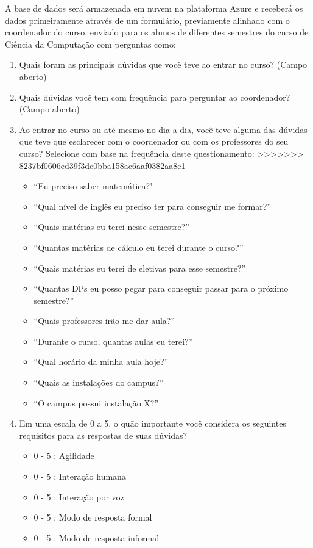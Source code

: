 \documentclass[
	12pt,				%
	oneside,
	a4paper,			%
	english,			%
	french,				%
	spanish,			%
	brazil				%
	]{abntex2}
\begin{document}
\begin{enumerate}
A base de dados será armazenada em nuvem na plataforma Azure e receberá os dados primeiramente através de um formulário, previamente alinhado com o coordenador do curso, enviado para os alunos de diferentes semestres do curso de Ciência da Computação com perguntas como:
\begin{enumerate}
\item Quais foram as principais dúvidas que você teve ao entrar no curso? (Campo aberto)
\item Quais dúvidas você tem com frequência para perguntar ao coordenador? (Campo aberto)

\item Ao entrar no curso ou até mesmo no dia a dia, você teve alguma das dúvidas que teve que esclarecer com o coordenador ou com os professores do seu curso? Selecione com base na frequência deste questionamento:
>>>>>>> 8237bf0606ed39f3dc0bba158ac6aaf0382aa8e1
\begin{itemize}
\item “Eu preciso saber matemática?"
\item “Qual nível de inglês eu preciso ter para conseguir me formar?”
\item “Quais matérias eu terei nesse semestre?”
\item “Quantas matérias de cálculo eu terei durante o curso?”
\item “Quais matérias eu terei de eletivas para esse semestre?”
\item “Quantas DPs eu posso pegar para conseguir passar para o próximo semestre?”
\item “Quais professores irão me dar aula?”
\item “Durante o curso, quantas aulas eu terei?”
\item “Qual horário da minha aula hoje?”
\item “Quais as instalações do campus?”
\item“O campus possui instalação X?”
\end{itemize}

\item Em uma escala de 0 a 5, o quão importante você considera os seguintes requisitos para as respostas de suas dúvidas?
\begin{itemize}
\item 0 - 5 : Agilidade
\item 0 - 5 : Interação humana
\item 0 - 5 : Interação por voz
\item 0 - 5 : Modo de resposta formal
\item 0 - 5 : Modo de resposta informal
\end{itemize}


\end{enumerate}
\end{enumerate}
\end{document}
